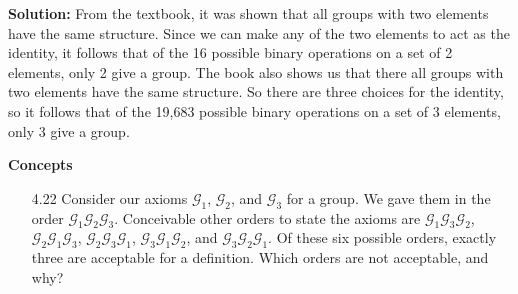 \begin{enumerate}
      \textbf{Solution:} From the textbook, it was shown that all groups with  
      two elements have the same structure. Since we can make any of the two
      elements to act as the identity, it follows that of the 16 possible binary
      operations on a set of 2 elements, only 2 give a group. The book also
      shows us that there all groups with two elements have the same structure.
      So there are three choices for the identity, so it follows that of the 
      19,683 possible binary operations on a set of 3 elements, only 3 give a 
      group.
\end{enumerate}

\noindent \textbf{Concepts}

\begin{enumerate}
   \item[4.22] Consider our axioms $\mathscr{G}_1$, $\mathscr{G}_2$, and
               $\mathscr{G}_3$ for a group. We gave them in the order
               $\mathscr{G}_1\mathscr{G}_2\mathscr{G}_3$. Conceivable other
               orders to state the axioms are
               $\mathscr{G}_1\mathscr{G}_3\mathscr{G}_2$,
               $\mathscr{G}_2\mathscr{G}_1\mathscr{G}_3$,
               $\mathscr{G}_2\mathscr{G}_3\mathscr{G}_1$,
               $\mathscr{G}_3\mathscr{G}_1\mathscr{G}_2$, and
               $\mathscr{G}_3\mathscr{G}_2\mathscr{G}_1$. Of these six possible
               orders, exactly three are acceptable for a definition. Which
               orders are not acceptable, and why?


\end{enumerate}
